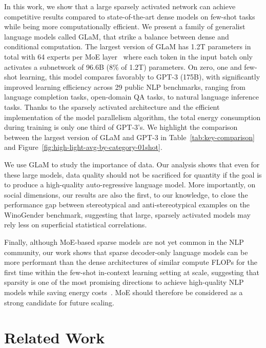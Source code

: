 In this work, we show that a large sparsely activated network can achieve competitive results compared to state-of-the-art dense models on few-shot tasks while being more computationally efficient. We present a family of generalist language models called GLaM, that strike a balance between dense and conditional computation. The largest version of GLaM has 1.2T parameters in total with 64 experts per MoE layer~\cite{shazeer2017outrageously,lepikhin2020gshard,fedus2021switch} where each token in the input batch only activates a subnetwork of 96.6B (8\% of 1.2T) parameters. On zero, one and few-shot learning, this model compares favorably to  GPT-3 (175B), with significantly improved learning efficiency across 29 public NLP benchmarks, ranging from language completion tasks, open-domain QA tasks, to natural language inference tasks. Thanks to the sparsely activated architecture and the efficient implementation of the model parallelism algorithm, the total energy consumption during training is only one third of GPT-3's. We highlight the comparison between the largest version of GLaM and GPT-3 in Table~\ref{tab:key-comparison} and Figure~\ref{fig:high-light-avg-by-category-01shot}. 

We use GLaM to study the importance of data. Our analysis shows that even for these large models, data quality should not be sacrificed for quantity if the goal is to produce a high-quality auto-regressive language model. More importantly, on social dimensions, our results are also the first, to our knowledge, to close the performance gap between stereotypical and anti-stereotypical examples on the WinoGender benchmark, suggesting that large, sparsely activated models may rely less on superficial statistical correlations.

Finally, although MoE-based sparse models are not yet common in the NLP community, our work shows that sparse decoder-only language models can be more performant than the dense architectures of similar compute FLOPs for the first time within the few-shot in-context learning setting at scale, suggesting that sparsity is one of the most promising directions to achieve high-quality NLP models while saving energy costs~\cite{patterson2021carbon}. MoE should therefore be considered as a strong candidate for future scaling. 

\section{Related Work}
\label{sec:related}

